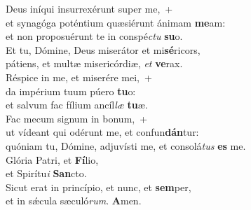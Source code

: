 \oddverse Deus iníqui insurrexérunt super me,~+\\
\oddverse  et synagóga poténtium quæsiérunt ánimam \textbf{me}am:~\*\\
\oddverse et non proposuérunt te in conspé\textit{ctu} \textbf{su}o.\\
\evenverse Et tu, Dómine, Deus miserátor et mi\textbf{sé}ricors,~\*\\
\evenverse pátiens, et multæ misericórdiæ, \textit{et} \textbf{ve}rax.\\
\oddverse Réspice in me, et miserére mei,~+\\
\oddverse  da impérium tuum púero \textbf{tu}o:~\*\\
\oddverse et salvum fac fílium ancíl\textit{læ} \textbf{tu}æ.\\
\evenverse Fac mecum signum in bonum,~+\\
\evenverse  ut vídeant qui odérunt me, et confun\textbf{dán}tur:~\*\\
\evenverse quóniam tu, Dómine, adjuvísti me, et consolá\textit{tus} \textbf{es} me.\\
\oddverse Glória Patri, et \textbf{Fí}lio,~\*\\
\oddverse et Spirítu\textit{i} \textbf{San}cto.\\
\evenverse Sicut erat in princípio, et nunc, et \textbf{sem}per,~\*\\
\evenverse et in sǽcula sæculó\textit{rum}. \textbf{A}men.\\
